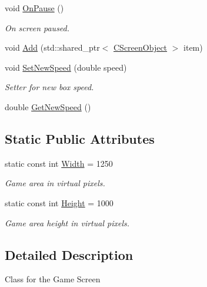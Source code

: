 \begin{DoxyCompactItemize}
void \mbox{\hyperlink{class_c_screen_a483c77121786543b4047874217d33b73}{On\+Pause}} ()
\begin{DoxyCompactList}\small\item\em On screen paused. \end{DoxyCompactList}\item 
void \mbox{\hyperlink{class_c_screen_a773492fc00dd2816841043f5b6b97107}{Add}} (std\+::shared\+\_\+ptr$<$ \mbox{\hyperlink{class_c_screen_object}{C\+Screen\+Object}} $>$ item)
\item 
\mbox{\label{class_c_screen_a9702a83af1519840745c4584b3a28f4c}} 
void \mbox{\hyperlink{class_c_screen_a9702a83af1519840745c4584b3a28f4c}{Set\+New\+Speed}} (double speed)
\begin{DoxyCompactList}\small\item\em Setter for new box speed. \end{DoxyCompactList}\item 
double \mbox{\hyperlink{class_c_screen_a8ec35e05509f898ec58cc6aefbbb3389}{Get\+New\+Speed}} ()
\end{DoxyCompactItemize}
\subsection*{Static Public Attributes}
\begin{DoxyCompactItemize}
\item 
\mbox{\label{class_c_screen_a91a8f0e25ceb9d9814a755f23e08fe32}} 
static const int \mbox{\hyperlink{class_c_screen_a91a8f0e25ceb9d9814a755f23e08fe32}{Width}} = 1250
\begin{DoxyCompactList}\small\item\em Game area in virtual pixels. \end{DoxyCompactList}\item 
\mbox{\label{class_c_screen_ae270120f33049f967f11218de5e37363}} 
static const int \mbox{\hyperlink{class_c_screen_ae270120f33049f967f11218de5e37363}{Height}} = 1000
\begin{DoxyCompactList}\small\item\em Game area height in virtual pixels. \end{DoxyCompactList}\end{DoxyCompactItemize}


\subsection{Detailed Description}
Class for the Game Screen 

